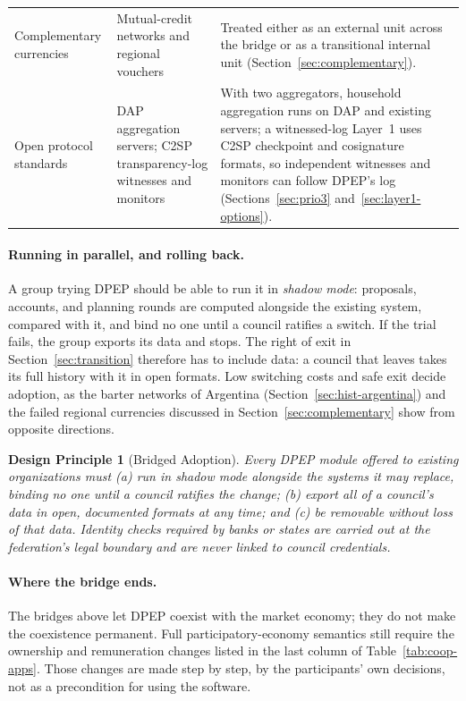 \documentclass[10pt,twoside,openany]{book}
\theoremstyle{dpepstyle}
\newtheorem{designrule}{Design Principle}[chapter]
\begin{document}
\begin{table}[htbp]
\begin{tabularx}{\textwidth}{L{0.95in} L{1.25in} Y}
Complementary currencies & Mutual-credit networks and regional vouchers & Treated either as an external unit across the bridge or as a transitional internal unit (Section~\ref{sec:complementary}). \\
Open protocol standards & DAP aggregation servers; C2SP transparency-log witnesses and monitors & With two aggregators, household aggregation runs on DAP and existing servers; a witnessed-log Layer~1 uses C2SP checkpoint and cosignature formats, so independent witnesses and monitors can follow DPEP's log (Sections~\ref{sec:prio3} and~\ref{sec:layer1-options}). \\
\bottomrule
\end{tabularx}
\end{table}

\paragraph{Running in parallel, and rolling back.} A group trying DPEP should be able to run it in \emph{shadow mode}: proposals, accounts, and planning rounds are computed alongside the existing system, compared with it, and bind no one until a council ratifies a switch. If the trial fails, the group exports its data and stops. The right of exit in Section~\ref{sec:transition} therefore has to include data: a council that leaves takes its full history with it in open formats. Low switching costs and safe exit decide adoption, as the barter networks of Argentina (Section~\ref{sec:hist-argentina}) and the failed regional currencies discussed in Section~\ref{sec:complementary} show from opposite directions.

\begin{designrule}[Bridged Adoption]\label{dp:bridged}
Every DPEP module offered to existing organizations must (a) run in shadow mode alongside the systems it may replace, binding no one until a council ratifies the change; (b) export all of a council's data in open, documented formats at any time; and (c) be removable without loss of that data. Identity checks required by banks or states are carried out at the federation's legal boundary and are never linked to council credentials.
\end{designrule}

\paragraph{Where the bridge ends.} The bridges above let DPEP coexist with the market economy; they do not make the coexistence permanent. Full participatory-economy semantics still require the ownership and remuneration changes listed in the last column of Table~\ref{tab:coop-apps}. Those changes are made step by step, by the participants' own decisions, not as a precondition for using the software.
\end{document}

